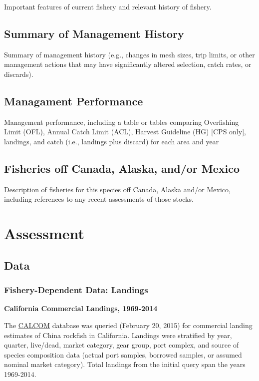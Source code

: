 \documentclass[12pt,]{article}
\begin{document}
Important features of current fishery and relevant history of fishery.

\subsection{Summary of Management
History}\label{summary-of-management-history}

Summary of management history (e.g., changes in mesh sizes, trip limits,
or other management actions that may have significantly altered
selection, catch rates, or discards).

\subsection{Managament Performance}\label{managament-performance}

Management performance, including a table or tables comparing
Overfishing Limit (OFL), Annual Catch Limit (ACL), Harvest Guideline
(HG) {[}CPS only{]}, landings, and catch (i.e., landings plus discard)
for each area and year

\subsection{Fisheries off Canada, Alaska, and/or
Mexico}\label{fisheries-off-canada-alaska-andor-mexico}

Description of fisheries for this species off Canada, Alaska and/or
Mexico, including references to any recent assessments of those stocks.

\section{Assessment}\label{assessment}

\subsection{Data}\label{data}

\subsubsection{Fishery-Dependent Data:
Landings}\label{fishery-dependent-data-landings}

\textbf{California Commercial Landings, 1969-2014}

The \href{http://128.114.3.187/}{CALCOM} database was queried (February
20, 2015) for commercial landing estimates of China rockfish in
California. Landings were stratified by year, quarter, live/dead, market
category, gear group, port complex, and source of species composition
data (actual port samples, borrowed samples, or assumed nominal market
category). Total landings from the initial query span the years
1969-2014.
\end{document}
